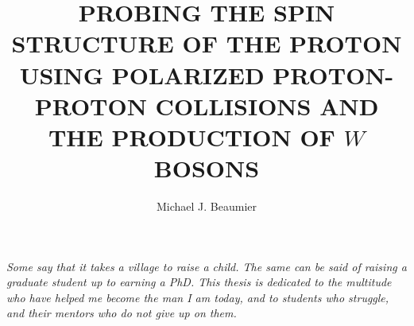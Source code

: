 \documentclass[11pt, draft, oneside, letterpaper]{ucr}
\begin{document}

\title{PROBING THE SPIN STRUCTURE OF THE PROTON USING POLARIZED PROTON-PROTON
COLLISIONS AND THE PRODUCTION OF $W$ BOSONS}
\author{Michael J. Beaumier}

\maketitle
\copyrightpage{}
\approvalpage{}


\begin{frontmatter}

\begin{acknowledgements}
	
\end{acknowledgements}

\begin{dedication}
\null\vfil
{\large
\begin{center}
  \textit{
	Some say that it takes a village to raise a child. The same can be said of
	raising a graduate student up to earning a PhD. This thesis is dedicated to
	the multitude who have helped me become the man I am today, and to students
	who struggle, and their mentors who do not give up on them. \\
}
\end{center}}
\vfil\null
\end{dedication}



\tableofcontents
\listoffigures
\listoftables
\end{frontmatter}












 

\end{document}
